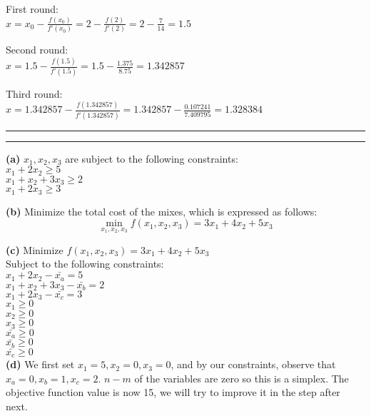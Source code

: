 \documentclass[11pt,letterpaper]{article}
\newcommand{\question}[1] {\vspace{.25in} \hrule\vspace{0.5em}
\noindent{\bf #1} \vspace{0.5em}
\hrule \vspace{.10in}}
\renewcommand{\part}[1] {\vspace{.10in} {\bf (#1)}}
\begin{document}
\newcommand{\newtx}[1]{#1 - \frac{f(#1)}{f'(#1)}}
\newcommand{\newtxx}[3]{#1 - \frac{#2}{#3}}
First round:\\
$x = \newtx{{x_0}} = \newtx{2} = \newtxx{2}{7}{14} = 1.5$

Second round:\\
$x =  \newtx{1.5} = \newtxx{1.5}{1.375}{8.75} = 1.342857$

Third round:\\
$x = \newtx{1.342857} = \newtxx{1.342857}{0.107241}{7.409795} = 1.328384$


\question{3}
\part{a}
$x_1, x_2, x_3$ are subject to the following constraints:\\
$x_1 + 2x_2 \geq 5$\\
$x_1 + x_2 + 3x_3 \geq 2$\\
$x_1 + 2x_3 \geq 3$

\part{b}
Minimize the total cost of the mixes, which is expressed as follows:
$$\min_{x_1, x_2, x_3} f(x_1, x_2, x_3) = 3x_1 + 4x_2 + 5x_3$$

\part{c}
Minimize $f(x_1, x_2, x_3) = 3x_1 + 4x_2 + 5x_3$\\
Subject to the following constraints:\\
$x_1 + 2x_2 - \bar{x_a} = 5$\\
$x_1 + x_2 + 3x_3 - \bar{x_b} = 2$\\
$x_1 + 2x_3 - \bar{x_c} = 3$\\
$x_1 \geq 0$\\
$x_2 \geq 0$\\
$x_3 \geq 0$\\
$\bar{x_a} \geq 0$\\
$\bar{x_b} \geq 0$\\
$\bar{x_c} \geq 0$\\

\part{d}
We first set $x_1 = 5, x_2 = 0, x_3 = 0$, and by our constraints,
observe that $x_a = 0, x_b = 1, x_c = 2$. $n-m$ of the variables are zero so this is a simplex.
The objective function value is now 15, we will try to improve it in the step after next.
\end{document}

